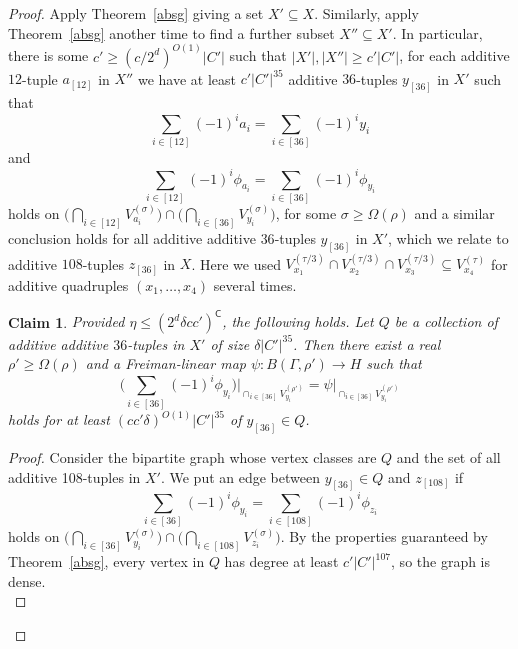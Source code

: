 \documentclass[a4paper,11pt]{article}
\numberwithin{theorem}{section}
\newtheorem{claim}[theorem]{Claim}
\theoremstyle{definition}
\newcommand{\blc}{\bm{\mathsf{C}}}
\begin{document}
\begin{proof}
    Apply Theorem~\ref{absg} giving a set $X' \subseteq X$. Similarly, apply Theorem~\ref{absg} another time to find a further subset $X'' \subseteq X'$. In particular, there is some $c' \geq (c/2^d)^{O(1)}|C'|$ such that $|X'|, |X''| \geq c' |C'|$, for each additive $12$-tuple $a_{[12]}$ in $X''$ we have at least $c'|C'|^{35}$ additive $36$-tuples $y_{[36]}$ in $X'$ such that 
    \[\sum_{i \in [12]}(-1)^i a_i = \sum_{i \in [36]} (-1)^iy_i\]
    and
    \begin{equation}\label{xsecundumtoxprime}\sum_{i \in [12]}(-1)^i \phi_{a_i} = \sum_{i \in [36]} (-1)^i \phi_{y_i}\end{equation}
    holds on $\Big(\bigcap_{i \in [12]} V^{(\sigma)}_{a_i}\Big) \cap \Big(\bigcap_{i \in [36]} V^{(\sigma)}_{y_i}\Big)$, for some $\sigma \geq \Omega(\rho)$ and a similar conclusion holds for all additive additive $36$-tuples $y_{[36]}$ in $X'$, which we relate to additive $108$-tuples $z_{[36]}$ in $X$. Here we used $V^{(\tau/3)}_{x_1} \cap V^{(\tau/3)}_{x_2} \cap V^{(\tau/3)}_{x_3} \subseteq V^{(\tau)}_{x_4}$ for additive quadruples $(x_1, \dots, x_4)$ several times.\\

    \begin{claim}
        Provided $\eta \leq (2^d\delta c c')^{\blc}$, the following holds. Let $Q$ be a collection of additive additive $36$-tuples in $X'$ of size $\delta |C'|^{35}$. Then there exist a real $\rho' \geq \Omega(\rho)$ and a Freiman-linear map $\psi : B(\Gamma, \rho') \to H$ such that 
        \[\Big(\sum_{i \in [36]} (-1)^i \phi_{y_i}\Big)\Big|_{\cap_{i \in [36]} V^{(\rho')}_{y_i}} = \psi|_{\cap_{i \in [36]} V^{(\rho')}_{y_i}} \]
        holds for at least $(c c' \delta)^{O(1)} |C'|^{35}$ of $y_{[36]} \in Q$.
    \end{claim}

    \begin{proof}
        Consider the bipartite graph whose vertex classes are $Q$ and the set of all additive 108-tuples in $X'$. We put an edge between $y_{[36]} \in Q$ and $z_{[108]}$ if 
        \[\sum_{i \in [36]} (-1)^i \phi_{y_i} = \sum_{i \in [108]} (-1)^i \phi_{z_i}\]
        holds on $\Big(\bigcap_{i \in [36]} V^{(\sigma)}_{y_i}\Big) \cap \Big(\bigcap_{i \in [108]} V^{(\sigma)}_{z_i}\Big)$. By the properties guaranteed by Theorem~\ref{absg}, every vertex in $Q$ has degree at least $c' |C'|^{107}$, so the graph is dense.\\


\end{proof}
\end{proof}
\end{document}
